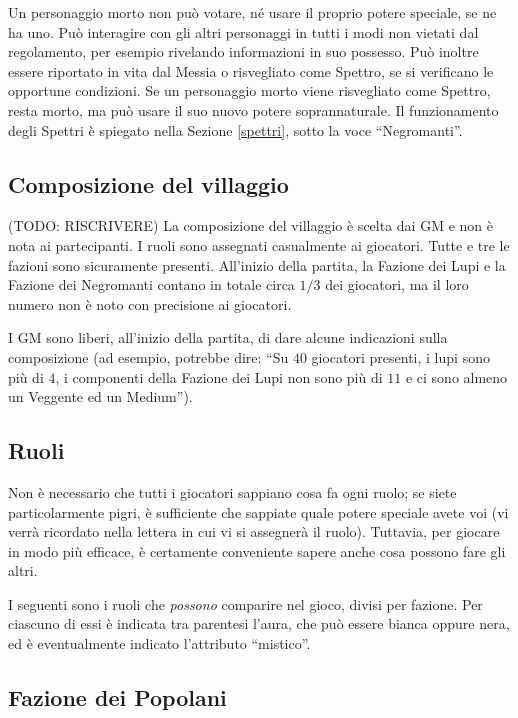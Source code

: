 \documentclass[a4paper,10pt]{article}
\begin{document}
Un personaggio morto non può votare, né usare il proprio potere speciale, se ne ha uno. Può interagire con gli altri personaggi in tutti i modi non vietati dal regolamento, per esempio rivelando informazioni in suo possesso. Può inoltre essere riportato in vita dal Messia o risvegliato come Spettro, se si verificano le opportune condizioni.
Se un personaggio morto viene risvegliato come Spettro, resta morto, ma può usare il suo nuovo potere soprannaturale. Il funzionamento degli Spettri è spiegato nella Sezione \ref{spettri}, sotto la voce ``Negromanti''.


\subsection{Composizione del villaggio}

(TODO: RISCRIVERE)
La composizione del villaggio è scelta dai GM e non è nota ai partecipanti. I ruoli sono assegnati casualmente ai giocatori.
Tutte e tre le fazioni sono sicuramente presenti. All'inizio della partita, la Fazione dei Lupi e la Fazione dei Negromanti contano in totale circa $1/3$ dei giocatori, ma il loro numero non è noto con precisione ai giocatori.

I GM sono liberi, all'inizio della partita, di dare alcune indicazioni sulla composizione (ad esempio, potrebbe dire: ``Su $40$ giocatori presenti, i lupi sono più di $4$, i componenti della Fazione dei Lupi non sono più di $11$ e ci sono almeno un Veggente ed un Medium'').


\subsection{Ruoli}

Non è necessario che tutti i giocatori sappiano cosa fa ogni ruolo; se siete particolarmente pigri, è sufficiente che sappiate quale potere speciale avete voi (vi verrà ricordato nella lettera in cui vi si assegnerà il ruolo). Tuttavia, per giocare in modo più efficace, è certamente conveniente sapere anche cosa possono fare gli altri.


I seguenti sono i ruoli che \emph{possono} comparire nel gioco, divisi per fazione.
Per ciascuno di essi è indicata tra parentesi l'aura, che può essere bianca oppure nera, ed è eventualmente indicato l'attributo ``mistico''.


\subsection*{Fazione dei Popolani}
\end{document}
